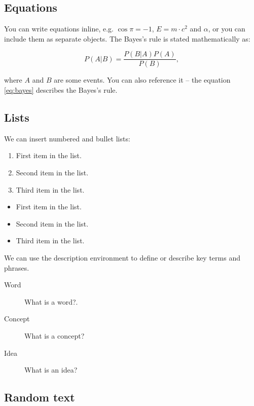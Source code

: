 \documentclass[fleqn,moreauthors,10pt]{ds_report}
\begin{document}
\subsection*{Equations}

You can write equations inline, e.g. $\cos\pi=-1$, $E = m \cdot c^2$ and $\alpha$, or you can include them as separate objects. The Bayes’s rule is stated mathematically as:

\begin{equation}
	P(A|B) = \frac{P(B|A)P(A)}{P(B)},
	\label{eq:bayes}
\end{equation}

where $A$ and $B$ are some events. You can also reference it -- the equation \ref{eq:bayes} describes the Bayes's rule.

\subsection*{Lists}

We can insert numbered and bullet lists:

\begin{enumerate}[noitemsep] 
	\item First item in the list.
	\item Second item in the list.
	\item Third item in the list.
\end{enumerate}

\begin{itemize}[noitemsep] 
	\item First item in the list.
	\item Second item in the list.
	\item Third item in the list.
\end{itemize}

We can use the description environment to define or describe key terms and phrases.

\begin{description}
	\item[Word] What is a word?.
	\item[Concept] What is a concept?
	\item[Idea] What is an idea?
\end{description}


\subsection*{Random text}
\end{document}
